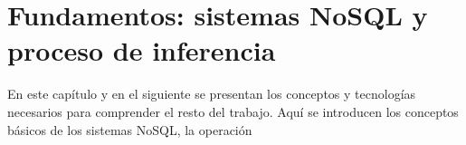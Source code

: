 \chapter{Fundamentos: sistemas NoSQL y proceso de
  inferencia\label{cap:03background}}

En este capítulo y en el siguiente se presentan los conceptos y
tecnologías necesarios para comprender el resto del trabajo. Aquí se
introducen los conceptos básicos de los sistemas NoSQL, la operación

